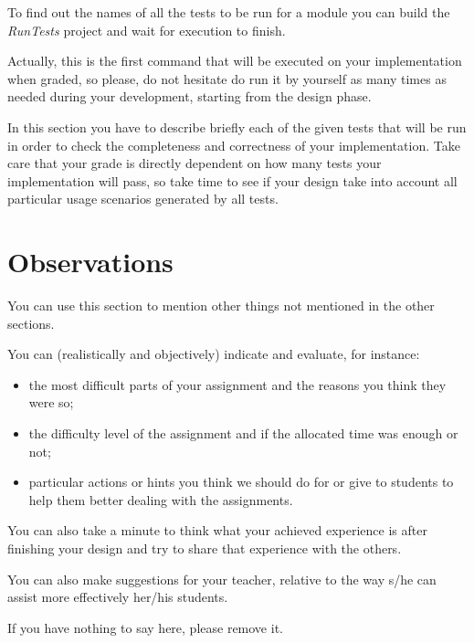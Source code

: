 To find out the names of all the tests to be run for a module you can build the \textit{RunTests} project and wait for execution to finish.

Actually, this is the first command that will be executed on your implementation when graded, so please, do not hesitate do run it by yourself as many times as needed during your \OSName{} development, starting from the design phase. 

In this section you have to describe briefly each of the given \OSName{} tests that will be run in order to check the completeness and correctness of your implementation. 
Take care that your grade is directly dependent on how many tests your implementation will pass, so take time to see if your design take into account all particular usage scenarios generated by all \OSName{} tests. 


\section{Observations}

You can use this section to mention other things not mentioned in the other sections. 

You can (realistically and objectively) indicate and evaluate, for instance:
\begin{itemize}
	\item the most difficult parts of your assignment and the reasons you think they were so; 
	
	\item the difficulty level of the assignment and if the allocated time was enough or not; 

	\item particular actions or hints you think we should do for or give to students to help them better dealing with the assignments.

\end{itemize}

You can also take a minute to think what your achieved experience is after finishing your design and try to share that experience with the others. 

You can also make suggestions for your teacher, relative to the way s/he can assist more effectively her/his students.

If you have nothing to say here, please remove it.
